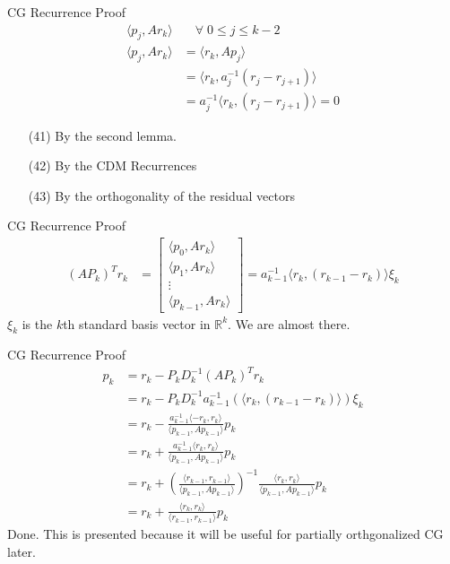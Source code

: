 \documentclass{beamer}
\begin{document}
    \begin{frame}{CG Recurrence Proof}
        \begin{align}
            \langle p_j, Ar_k\rangle& \quad \forall\; 0 \le j \le k -2 
            \\
            \langle p_j, Ar_k\rangle&= \langle r_k, Ap_j\rangle
            \\
            &= \langle r_k, a_j^{-1}(r_j - r_{j + 1})\rangle
            \\
            &= a_j^{-1}\langle r_k, (r_j - r_{j + 1})\rangle = 0
        \end{align}
        \begin{itemize}
            \item[(41)] By the second lemma. 
            \item[(42)] By the CDM Recurrences
            \item[(43)] By the orthogonality of the residual vectors 
        \end{itemize}
    \end{frame}
    \begin{frame}{CG Recurrence Proof}
        \begin{align}
            (AP_k)^Tr_k &= 
            \begin{bmatrix}
                \langle p_0, Ar_k\rangle
                \\
                \langle p_1, Ar_k\rangle
                \\
                \vdots
                \\
                \langle p_{k - 1}, Ar_k\rangle
            \end{bmatrix}
            = 
            a_{k - 1}^{-1}\langle r_k, (r_{k - 1} - r_{k})\rangle \xi_k
        \end{align}
        $\xi_k$ is the $k$th standard basis vector in $\mathbb R^k$. We are almost there. 
    \end{frame}
    \begin{frame}{CG Recurrence Proof}
        \begin{align}
            p_k &= r_k - P_kD^{-1}_k(AP_k)^Tr_k
            \\
            &= r_k - P_kD_k^{-1}a_{k - 1}^{-1}(\langle r_k, (r_{k - 1} - r_{k})\rangle) \xi_k
            \\
            &= 
            r_k - \frac{a_{k -1}^{-1}\langle -r_k, r_k\rangle}
            {\langle p_{k - 1}, Ap_{k - 1}\rangle}p_k
            \\
            &= r_k + \frac{a_{k -1}^{-1}\langle r_k, r_k\rangle}
            {\langle p_{k - 1}, Ap_{k - 1}\rangle}p_k
            \\
            &= r_k + 
            \left(
                \frac{\langle r_{k - 1}, r_{k - 1}\rangle}{\langle p_{k - 1}, Ap_{k - 1}\rangle}
            \right)^{-1}
            \frac{\langle r_k, r_k\rangle}{\langle p_{k - 1}, Ap_{k - 1}\rangle}p_k
            \\
            &= 
            r_k + \frac{\langle r_k, r_k\rangle}{\langle r_{k - 1}, r_{k - 1}\rangle}p_k
        \end{align}
        Done. This is presented because it will be useful for partially orthgonalized CG later. 
    \end{frame}
\end{document}
